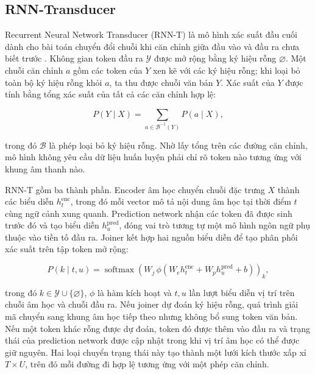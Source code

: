 \documentclass[a4paper,13pt,twoside]{report}
\begin{document}
\subsection{RNN-Transducer}

Recurrent Neural Network Transducer (RNN-T) là mô hình xác suất đầu cuối dành cho bài toán chuyển đổi chuỗi khi căn chỉnh giữa đầu vào và đầu ra chưa biết trước \cite{rnnt}. Không gian token đầu ra \(\mathcal{Y}\) được mở rộng bằng ký hiệu rỗng \(\varnothing\). Một chuỗi căn chỉnh \(a\) gồm các token của \(Y\) xen kẽ với các ký hiệu rỗng; khi loại bỏ toàn bộ ký hiệu rỗng khỏi \(a\), ta thu được chuỗi văn bản \(Y\). Xác suất của \(Y\) được tính bằng tổng xác suất của tất cả các căn chỉnh hợp lệ:

\begin{equation}
    P(Y\mid X)
    =
    \sum_{a\in\mathcal{B}^{-1}(Y)}
    P(a\mid X),
\end{equation}

trong đó \(\mathcal{B}\) là phép loại bỏ ký hiệu rỗng. Nhờ lấy tổng trên các đường căn chỉnh, mô hình không yêu cầu dữ liệu huấn luyện phải chỉ rõ token nào tương ứng với khung âm thanh nào.

RNN-T gồm ba thành phần. Encoder âm học chuyển chuỗi đặc trưng \(X\) thành các biểu diễn \(h_t^{\mathrm{enc}}\), trong đó mỗi vector mô tả nội dung âm học tại thời điểm \(t\) cùng ngữ cảnh xung quanh. Prediction network nhận các token đã được sinh trước đó và tạo biểu diễn \(h_u^{\mathrm{pred}}\), đóng vai trò tương tự một mô hình ngôn ngữ phụ thuộc vào tiền tố đầu ra. Joiner kết hợp hai nguồn biểu diễn để tạo phân phối xác suất trên tập token mở rộng:

\begin{equation}
    P(k\mid t,u)
    =
    \operatorname{softmax}
    \left(
    W_j\,
    \phi\left(
        W_e h_t^{\mathrm{enc}}
        +
        W_p h_u^{\mathrm{pred}}
        +b
        \right)
    \right)_k,
\end{equation}

trong đó \(k\in\mathcal{Y}\cup\{\varnothing\}\), \(\phi\) là hàm kích hoạt và \(t,u\) lần lượt biểu diễn vị trí trên chuỗi âm học và chuỗi đầu ra. Nếu joiner dự đoán ký hiệu rỗng, quá trình giải mã chuyển sang khung âm học tiếp theo nhưng không bổ sung token văn bản. Nếu một token khác rỗng được dự đoán, token đó được thêm vào đầu ra và trạng thái của prediction network được cập nhật trong khi vị trí âm học có thể được giữ nguyên. Hai loại chuyển trạng thái này tạo thành một lưới kích thước xấp xỉ \(T\times U\), trên đó mỗi đường đi hợp lệ tương ứng với một phép căn chỉnh.
\end{document}
